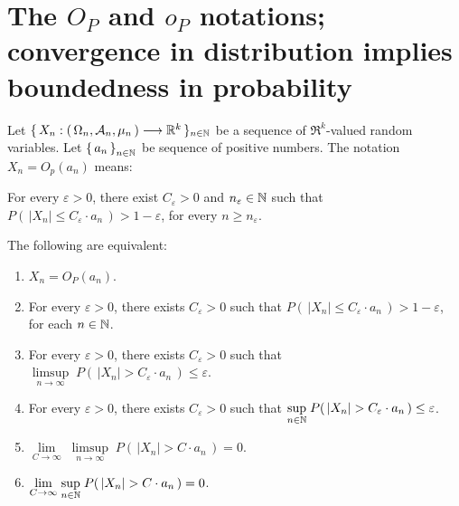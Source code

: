

\section{The $O_{P}$ and $o_{P}$ notations; convergence in distribution implies boundedness in probability}
\setcounter{theorem}{0}
\setcounter{equation}{0}

\begin{definition}
\mbox{}\vskip 0.1cm
\noindent
Let $\{\,X_{n} : \left(\,\Omega_{n},\mathcal{A}_{n},\mu_{n}\,\right) \longrightarrow \mathbb{R}^{k}\,\}_{n \in \mathbb{N}}$
be a sequence of $\Re^{k}$-valued random variables.
Let $\left\{\,a_{n}\,\right\}_{n \in \mathbb{N}}$ be sequence of positive numbers.
The notation $X_{n} = O_{p}(a_{n})$ means:
\begin{center}
For every $\varepsilon > 0$, there exist $C_{\varepsilon} > 0$ and $n_{\varepsilon} \in \mathbb{N}$
such that $P\!\left(\,|X_{n}| \leq C_{\varepsilon}\cdot a_{n}\,\right) > 1 - \varepsilon$, for every $n \geq n_{\varepsilon}$. 
\end{center}
\end{definition}

\renewcommand{\theenumi}{\alph{enumi}}
\renewcommand{\labelenumi}{\textnormal{(\theenumi)}$\;\;$}

\begin{proposition}
\quad
The following are equivalent:
\begin{enumerate}
\item \label{bigOPa} $X_{n} = O_{P}(a_{n})$.

\item\label{bigOPb}
For every $\varepsilon > 0$, there exists $C_{\varepsilon} > 0$ such that
$P\!\left(\,|X_{n}| \leq C_{\varepsilon}\cdot a_{n}\,\right) > 1 - \varepsilon$, for each $n \in \mathbb{N}$.

\item\label{bigOPc}
For every $\varepsilon > 0$, there exists $C_{\varepsilon} > 0$ such that
$\underset{n\rightarrow\infty}{\limsup}\;P\!\left(\,|X_{n}| > C_{\varepsilon}\cdot a_{n}\,\right) \leq \varepsilon$.

\item\label{bigOPd}
For every $\varepsilon > 0$, there exists $C_{\varepsilon} > 0$ such that
$\underset{n \in \mathbb{N}}{\sup}\;P\!\left(\,|X_{n}| > C_{\varepsilon}\cdot a_{n}\,\right) \leq \varepsilon$.

\item\label{bigOPe}
$\underset{C\rightarrow\infty}{\lim}\;\underset{n\rightarrow\infty}{\limsup}\;P\!\left(\,|X_{n}| > C \cdot a_{n}\,\right) = 0$.

\item\label{bigOPf}
$\underset{C\rightarrow\infty}{\lim}\;\underset{n\in\mathbb{N}}{\sup}\;P\!\left(\,|X_{n}| > C \cdot a_{n}\,\right) = 0$.

\end{enumerate}
\end{proposition}

